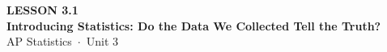 \documentclass[aspectratio=169, 11pt]{beamer}
\begin{document}
{
\begin{frame}[plain]
  \vspace{2.8cm}\hspace{0.55cm}%
  \begin{minipage}{0.9\textwidth}
    {\color{goldacc}\bfseries\small LESSON 3.1}\\[0.5cm]
    {\color{white}\bfseries\LARGE Introducing Statistics: Do the Data We Collected Tell the Truth?}\\[1.2cm]
    {\color{skymid}\small AP Statistics~$\cdot$~Unit 3}
  \end{minipage}
\end{frame}
}

\begin{frame}[t, plain]
\end{frame}
\end{document}
